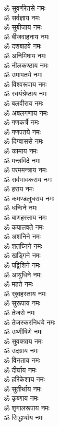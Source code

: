 \begin{multicols}{2}
\begin{flushleft}
ॐ सुवर्णरेतसे नमः\\
ॐ सर्वज्ञाय नमः\\
ॐ सुबीजाय नमः\\
ॐ बीजवाहनाय नमः\hfill{}\\
ॐ दशबाहवे नमः\\
ॐ अनिमिषाय नमः\\
ॐ नीलकण्ठाय नमः\\
ॐ उमापतये नमः\\
ॐ विश्वरूपाय नमः\\
ॐ स्वयंश्रेष्ठाय नमः\\
ॐ बलवीराय नमः\\
ॐ अबलगणाय नमः\\
ॐ गणकर्त्रे नमः\\
ॐ गणपतये नमः\hfill{}\\
ॐ दिग्वाससे नमः\\
ॐ कामाय नमः\\
ॐ मन्त्रविदे नमः\\
ॐ परममन्त्राय नमः\\
ॐ सर्वभावकराय नमः\\
ॐ हराय नमः\\
ॐ कमण्डलुधराय नमः\\
ॐ धन्विने नमः\\
ॐ बाणहस्ताय नमः\\
ॐ कपालवते नमः\hfill{}\\
ॐ अशनिने नमः\\
ॐ शतघ्निने नमः\\
ॐ खड्गिने नमः\\
ॐ पट्टिशिने नमः\\
ॐ आयुधिने नमः\\
ॐ महते नमः\\
ॐ स्रुवहस्ताय नमः\\
ॐ सुरूपाय नमः\\
ॐ तेजसे नमः\\
ॐ तेजस्करनिधये नमः\hfill{}\\
ॐ उष्णीषिणे नमः\\
ॐ सुवक्त्राय नमः\\
ॐ उदग्राय नमः\\
ॐ विनताय नमः\\
ॐ दीर्घाय नमः\\
ॐ हरिकेशाय नमः\\
ॐ सुतीर्थाय नमः\\
ॐ कृष्णाय नमः\\
ॐ शृगालरूपाय नमः\\
ॐ सिद्धार्थाय नमः\hfill{}\\

\end{flushleft}
\end{multicols}
